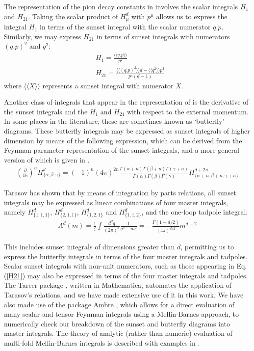 \documentclass[12pt,a4paper]{article}
\begin{document}
The representation of the pion decay constants in \cite{Amoros:1999dp} involves the scalar integrals $H_1$ and $H_{21}$. Taking the scalar product of $H_{\mu}^d$ with $p^{\mu}$ allows us to express the integral $H_1$ in terms of the sunset integral with the scalar numerator $q.p$. Similarly, we may express $H_{21}$ in terms of sunset integrals with numerators $(q.p)^2$ and $q^2$:
\begin{align}
	& H_1 = \frac{\langle \langle q.p \rangle \rangle}{p^2} \nonumber \\
	& H_{21} = \frac{\langle \langle (q.p)^2 \rangle \rangle d - \langle \langle q^2 \rangle \rangle p^2}{p^4 (d-1)} 
\end{align}
where $\langle \langle X \rangle \rangle$ represents a sunset integral with numerator $X$.

Another class of integrals that appear in the representation of \cite{Amoros:1999dp} is the derivative of the sunset integrals and the $H_1$ and $H_{21}$ with respect to the external momentum. In some places in the literature, these are sometimes known as `butterfly' diagrams. These butterfly integrals may be expressed as sunset integrals of higher dimension by means of the following expression, which can be derived from the Feynman parameter representation of the sunset integrals, and a more general version of which is given in \cite{Kaiser:2007kf}.
\begin{align}
	\left( \frac{\partial}{\partial s} \right)^n H_{\{\alpha,\beta,\gamma\}}^d = (-1)^n (4 \pi)^{2n} \frac{\Gamma(\alpha+n) \Gamma(\beta+n) \Gamma(\gamma+n)}{\Gamma(\alpha) \Gamma(\beta)\Gamma(\gamma)} H_{\{\alpha+n,\beta+n,\gamma+n\}}^{d+2n}
\end{align}

Tarasov \cite{Tarasov:1997kx} has shown that by means of integration by parts relations, all sunset integrals may be expressed as linear combinations of four master integrals, namely $H_{\{1,1,1\}}^d$, $H_{\{2,1,1\}}^d$, $H_{\{1,2,1\}}^d$ and $H_{\{1,1,2\}}^d$, and the one-loop tadpole integral:
\begin{align}
	A^d(m) = \frac{1}{i} \int \frac{d^d q}{(2\pi)^d} \frac{1}{q^2 - m^2} = - \frac{ \Gamma \left( 1-d/2 \right)}{(4\pi)^{d/2}} m^{d-2}
\end{align}

This includes sunset integrals of dimensions greater than $d$, permitting us to express the butterfly integrals in terms of the four master integrals and tadpoles. Scalar sunset integrals with non-unit numerators, such as those appearing in Eq.(\ref{H21}) may also be expressed in terms of the four master integrals and tadpoles. The Tarcer package \cite{Mertig:1998vk}, written in Mathematica, automates the application of Tarasov's relations, and we have made extensive use of it in this work. We have also made use of the package Ambre \cite{Gluza:2007rt, Gluza:2010rn}, which allows for a direct evaluation of many scalar and tensor Feynman integrals using a Mellin-Barnes approach, to numerically check our breakdown of the sunset and butterfly diagrams into master integrals. The theory of analytic (rather than numeric) evaluation of multi-fold Mellin-Barnes integrals is described with examples in \cite{Friot:2011ic, Aguilar:2008qj}.
\end{document}
